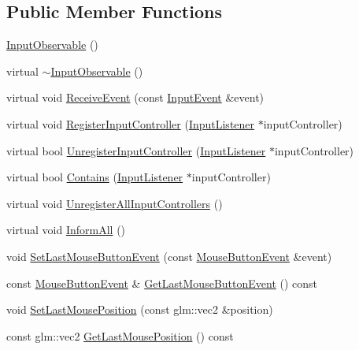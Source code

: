\subsection*{Public Member Functions}
\begin{DoxyCompactItemize}
\item 
\mbox{\hyperlink{classec_1_1_input_observable_a92422814189d1210f631f4d1378877f3}{Input\+Observable}} ()
\item 
virtual \mbox{\hyperlink{classec_1_1_input_observable_ac261f6a73cfdcd37c276e732cc25f869}{$\sim$\+Input\+Observable}} ()
\item 
virtual void \mbox{\hyperlink{classec_1_1_input_observable_aa043e1a78987c55e03acca7caf13820f}{Receive\+Event}} (const \mbox{\hyperlink{structec_1_1_input_event}{Input\+Event}} \&event)
\item 
virtual void \mbox{\hyperlink{classec_1_1_input_observable_a4c44ef2397e793b1d19aa2a166199a41}{Register\+Input\+Controller}} (\mbox{\hyperlink{classec_1_1_input_listener}{Input\+Listener}} $\ast$input\+Controller)
\item 
virtual bool \mbox{\hyperlink{classec_1_1_input_observable_a2db9e838abfe1910141cebdbebe13efb}{Unregister\+Input\+Controller}} (\mbox{\hyperlink{classec_1_1_input_listener}{Input\+Listener}} $\ast$input\+Controller)
\item 
virtual bool \mbox{\hyperlink{classec_1_1_input_observable_a6ecdba90416e0a70d56e13a2c74ade1c}{Contains}} (\mbox{\hyperlink{classec_1_1_input_listener}{Input\+Listener}} $\ast$input\+Controller)
\item 
virtual void \mbox{\hyperlink{classec_1_1_input_observable_a515f6e07f88351d9461ca192d2ead706}{Unregister\+All\+Input\+Controllers}} ()
\item 
virtual void \mbox{\hyperlink{classec_1_1_input_observable_a2c3af1f58103d41e21bd95fed9131c5b}{Inform\+All}} ()
\item 
void \mbox{\hyperlink{classec_1_1_input_observable_a4794f86124d9212e4055e8210c301cba}{Set\+Last\+Mouse\+Button\+Event}} (const \mbox{\hyperlink{structec_1_1_mouse_button_event}{Mouse\+Button\+Event}} \&event)
\item 
const \mbox{\hyperlink{structec_1_1_mouse_button_event}{Mouse\+Button\+Event}} \& \mbox{\hyperlink{classec_1_1_input_observable_a0bcd5b8b0dcc5c4eb7da52a9b26daa84}{Get\+Last\+Mouse\+Button\+Event}} () const
\item 
void \mbox{\hyperlink{classec_1_1_input_observable_a6884c5c8175136fa379086a0abc1d751}{Set\+Last\+Mouse\+Position}} (const glm\+::vec2 \&position)
\item 
const glm\+::vec2 \mbox{\hyperlink{classec_1_1_input_observable_a1c76c19bfc7c610090ca4f933506d45d}{Get\+Last\+Mouse\+Position}} () const
\end{DoxyCompactItemize}
